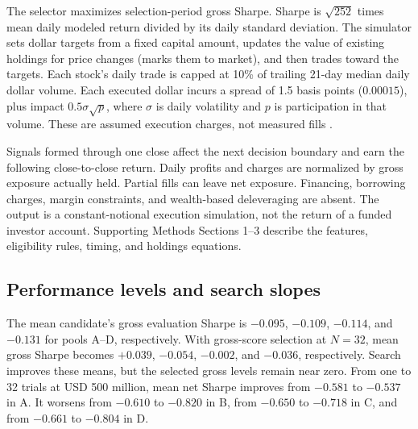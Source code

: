 \documentclass{article}
\begin{document}
The selector maximizes selection-period gross Sharpe. Sharpe is $\sqrt{252}$ times mean daily modeled return divided by its daily standard deviation. The simulator sets dollar targets from a fixed capital amount, updates the value of existing holdings for price changes (marks them to market), and then trades toward the targets. Each stock's daily trade is capped at 10\% of trailing 21-day median daily dollar volume. Each executed dollar incurs a spread of 1.5 basis points ($0.00015$), plus impact $0.5\sigma\sqrt p$, where $\sigma$ is daily volatility and $p$ is participation in that volume. These are assumed execution charges, not measured fills \citep{almgren2000optimal,almgren2005direct,toth2011anomalous}.

Signals formed through one close affect the next decision boundary and earn the following close-to-close return. Daily profits and charges are normalized by gross exposure actually held. Partial fills can leave net exposure. Financing, borrowing charges, margin constraints, and wealth-based deleveraging are absent. The output is a constant-notional execution simulation, not the return of a funded investor account. Supporting Methods Sections 1--3 describe the features, eligibility rules, timing, and holdings equations.

\subsection{Performance levels and search slopes}
The mean candidate's gross evaluation Sharpe is $-0.095$, $-0.109$, $-0.114$, and $-0.131$ for pools A--D, respectively. With gross-score selection at $N=32$, mean gross Sharpe becomes $+0.039$, $-0.054$, $-0.002$, and $-0.036$, respectively. Search improves these means, but the selected gross levels remain near zero. From one to 32 trials at USD 500 million, mean net Sharpe improves from $-0.581$ to $-0.537$ in A. It worsens from $-0.610$ to $-0.820$ in B, from $-0.650$ to $-0.718$ in C, and from $-0.661$ to $-0.804$ in D.
\end{document}
